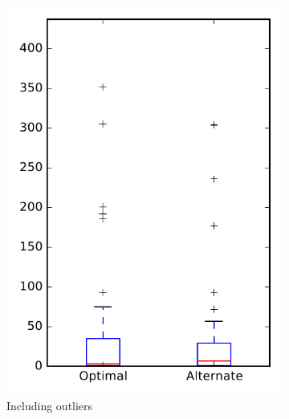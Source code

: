 
\begin{figure}
    \centering
    \begin{subfigure}{.4\textwidth}
        \centering
        \includegraphics[height=0.4\textheight]{figures/combo/flt_rq1_tika}
        \caption{Including outliers}\label{fig:combo:flt:rq1:tika_outlier}
    \end{subfigure}%
    \begin{subfigure}{.4\textwidth}
        \centering

\end{subfigure}
\end{figure}
